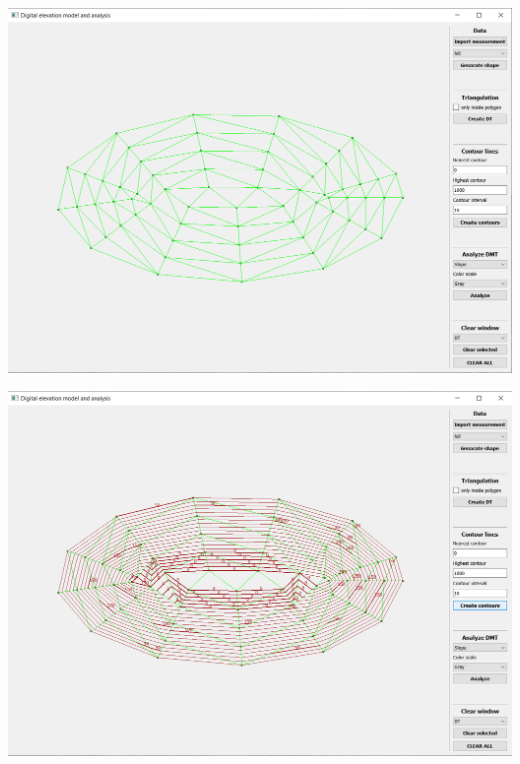 \documentclass[12pt]{article}
\begin{document}
\begin{center}
   \includegraphics[width=14cm]{./img/hill_DT.png}
\end{center}

\begin{center}
   \includegraphics[width=14cm]{./img/hill_contours.png}
\end{center}
\end{document}
